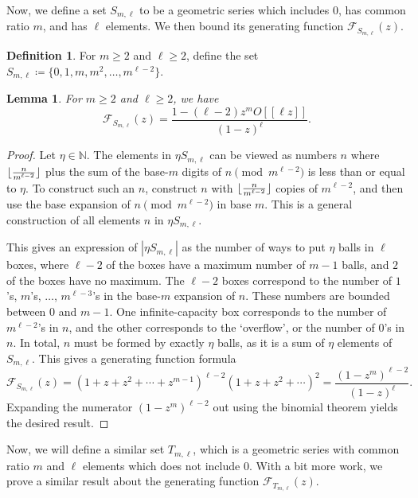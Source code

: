 \documentclass[10pt,a4paper]{article}
\newtheorem{lemma}[theorem]{Lemma}
\theoremstyle{definition}
\newtheorem{definition}[theorem]{Definition}
\theoremstyle{remark}
\numberwithin{equation}{section}
\numberwithin{theorem}{section}
\newcommand{\N}{\mathbb{N}}
\newcommand{\calf}{\mathcal{F}}
\DeclarePairedDelimiter{\floor}{\lfloor}{\rfloor}
\begin{document}
Now, we define a set $S_{m,\ell}$ to be a geometric series which includes 0, has common ratio $m$, and has $\ell$ elements. We then bound its generating function $\calf_{S_{m,\ell}}(z)$.

\begin{definition}
    For $m\geq 2$ and $\ell \geq 2$, define the set $S_{m,\ell}\coloneq  \{0,1,m,m^2,\ldots,m^{\ell-2}\}$.
\end{definition}

\begin{lemma}\label{lemmaHSML}
    For $m\geq 2$ and $\ell \geq 2$, we have 
    \[\calf_{S_{m,\ell}}(z) = \frac{1-(\ell-2)z^mO[[\ell z]]}{(1-z)^\ell}.\]
\end{lemma}

\begin{proof}
    Let $\eta \in \N$. The elements in $\eta S_{m,\ell}$ can be viewed as numbers $n$ where $\floor{\frac{n}{m^{\ell-2}}}$ plus the sum of the base-$m$ digits of $n \pmod{m^{\ell-2}}$ is less than or equal to $\eta$. To construct such an $n$, construct $n$ with $\floor{\frac{n}{m^{\ell-2}}}$ copies of $m^{\ell-2}$, and then use the base expansion of $n \pmod{m^{\ell-2}}$ in base $m$. This is a general construction of all elements $n$ in $\eta S_{m,\ell}$. 

    This gives an expression of $|\eta S_{m,\ell}|$ as the number of ways to put $\eta$ balls in $\ell$ boxes, where $\ell-2$ of the boxes have a maximum number of $m-1$ balls, and $2$ of the boxes have no maximum. The $\ell-2$ boxes correspond to the number of $1$'s, $m$'s, $\ldots$, $m^{\ell-3}$'s in the base-$m$ expansion of $n$. These numbers are bounded between $0$ and $m-1$. One infinite-capacity box corresponds to the number of $m^{\ell-2}$'s in $n$, and the other corresponds to the `overflow', or the number of $0$'s in $n$. In total, $n$ must be formed by exactly $\eta $ balls, as it is a sum of $\eta $ elements of $S_{m,\ell}$. This gives a generating function formula 
    \[\calf_{S_{m,\ell}}(z) = (1+z+z^2+\cdots+z^{m-1})^{\ell-2}(1+z+z^2+\cdots)^2 = \frac{(1-z^m)^{\ell-2}}{(1-z)^\ell}.\]
    Expanding the numerator $(1-z^m)^{\ell-2}$ out using the binomial theorem yields the desired result.
\end{proof}

Now, we will define a similar set $T_{m,\ell}$, which is a geometric series with common ratio $m$ and $\ell$ elements which does not include 0. With a bit more work, we prove a similar result about the generating function $\calf_{T_{m,\ell}}(z)$. 
\end{document}
